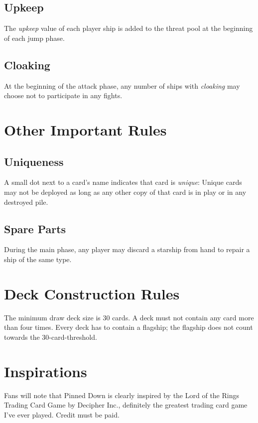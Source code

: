 \documentclass[11pt, a4paper]{article}
\begin{document}
\subsection{Upkeep}
\label{upkeep}

The \emph{upkeep} value of each player ship is added to the threat pool at the
beginning of each jump phase.

\subsection{Cloaking}

At the beginning of the attack phase, any number of ships with \emph{cloaking}
may choose not to participate in any fights.


\section{Other Important Rules}
\subsection{Uniqueness}

A small dot next to a card's name indicates that card is \emph{unique}: Unique
cards may not be deployed as long as any other copy of that card is in play or
in any destroyed pile.

\subsection{Spare Parts}

During the main phase, any player may discard a starship from hand to repair
a ship of the same type.

\section{Deck Construction Rules}

The minimum draw deck size is 30 cards. A deck must not contain any card more
than four times. Every deck has to contain a flagship; the flagship does not
count towards the 30-card-threshold.

\section{Inspirations}

Fans will note that Pinned Down is clearly inspired by the Lord of the Rings
Trading Card Game by Decipher Inc., definitely the greatest trading card game
I've ever played. Credit must be paid.
\end{document}
